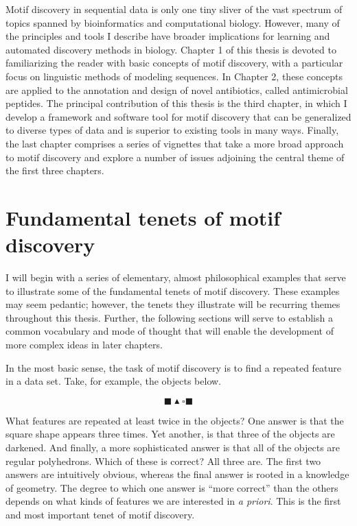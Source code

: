 Motif discovery in sequential data is only one tiny sliver of the
vast spectrum of topics spanned by bioinformatics and computational
biology. However, many of the principles and tools I describe have
broader implications for learning and automated discovery methods in
biology.  Chapter 1 of this thesis is devoted to familiarizing the
reader with basic concepts of motif discovery, with a particular
focus on linguistic methods of modeling sequences. In Chapter 2,
these concepts are applied to the annotation and design of novel
antibiotics, called antimicrobial peptides.  The principal
contribution of this thesis is the third chapter, in which I develop
a framework and software tool for motif discovery that can be
generalized to diverse types of data and is superior to existing
tools in many ways.  Finally, the last chapter comprises a series of
vignettes that take a more broad approach to motif discovery and
explore a number of issues adjoining the central theme of the first
three chapters.

\section{Fundamental tenets of motif discovery}\label{section:tenents}

I will begin with a series of elementary, almost philosophical
examples that serve to illustrate some of the fundamental tenets of
motif discovery. These examples may seem pedantic; however, the
tenets they illustrate will be recurring themes throughout this
thesis. Further, the following sections will serve to establish a
common vocabulary and mode of thought that will enable the
development of more complex ideas in later chapters.

In the most basic sense, the task of motif discovery is to find a
repeated feature in a data set.  Take, for example, the objects below.


\begin{equation}\label{eqn:shapes}
    \blacksquare\blacktriangle\square\blacksquare
\end{equation}



What features are repeated at least twice in the objects?  One
answer is that the square shape appears three times.  Yet another,
is that three of the objects are darkened.  And finally, a more
sophisticated answer is that all of the objects are regular
polyhedrons.  Which of these is correct? All three are.  The first
two answers are intuitively obvious, whereas the final answer is
rooted in a knowledge of geometry.  The degree to which one answer
is ``more correct'' than the others depends on what kinds of
features we are interested in \emph{a priori}.  This is the first
and most important tenet of motif discovery.


